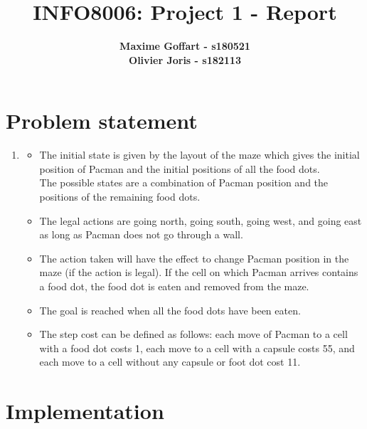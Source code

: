 \documentclass{article}
\begin{document}

\title{\Large{INFO8006: Project 1 - Report}}
\vspace{1cm}
\author{\small{\bf Maxime Goffart - s180521} \\ \small{\bf Olivier Joris - s182113}}

\maketitle


\section{Problem statement}

\begin{enumerate}[label=\alph*.,leftmargin=1.35em]
    \item
    	\begin{itemize}
    		\item The initial state is given by the layout of the maze which gives the initial position of Pacman and the initial positions of all the food dots.\\
    		 The possible states are a combination of Pacman position and the positions of the remaining food dots.
    		\item The legal actions are going north, going south, going west, and going east as long as Pacman does not go through a wall.
    		\item The action taken will have the effect to change Pacman position in the maze (if the action is legal). If the cell on which Pacman arrives contains a food dot, the food dot is eaten and removed from the maze.
    		\item The goal is reached when all the food dots have been eaten.
    		\item The step cost can be defined as follows: each move of Pacman to a cell with a food dot costs 1, each move to a cell with a capsule costs 55, and each move to a cell without any capsule or foot dot cost 11.
    	\end{itemize}
\end{enumerate}

\section{Implementation}
\end{document}
